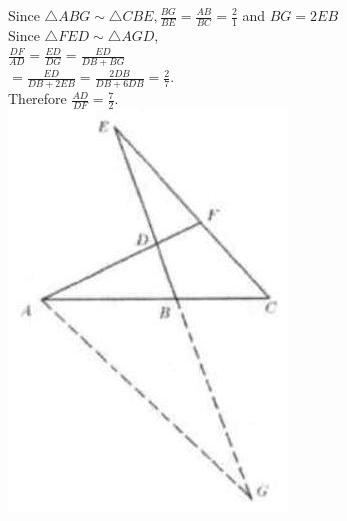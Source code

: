 \documentclass[10pt]{article}
\begin{document}
Since \(\triangle A B G \sim \triangle C B E, \frac{B G}{B E}=\frac{A B}{B C}=\frac{2}{1}\) and \(B G=2 E B\)\\
Since \(\triangle F E D \sim \triangle A G D\),\\
\(\frac{D F}{A D}=\frac{E D}{D G}=\frac{E D}{D B+B G}\)\\
\(=\frac{E D}{D B+2 E B}=\frac{2 D B}{D B+6 D B}=\frac{2}{7}\).\\
Therefore \(\frac{A D}{D F}=\frac{7}{2}\).\\
\includegraphics[max width=\textwidth, center]{2025_04_17_97bc1f7e44d93c271a88g-113(2)}
\end{document}
